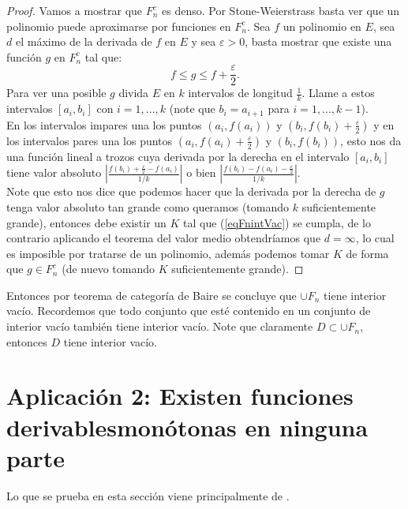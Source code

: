 \documentclass{article}
\theoremstyle{definition}
\begin{document}
\begin{proof}
Vamos a mostrar que $F_n^c$ es denso. Por Stone-Weierstrass basta ver que un polinomio puede aproximarse por funciones en $F_n^c$. Sea $f$ un polinomio en $E$, sea $d$ el máximo de la derivada de $f$ en $E$ y sea $\varepsilon>0$, basta mostrar que existe una función $g$ en $F_n^c$ tal que:
\begin{equation}\label{eqFnintVac}
f\leq g\leq f+\frac{\varepsilon}{2}.
\end{equation}
Para ver una posible $g$ divida $E$ en $k$ intervalos de longitud $\frac{1}{k}$. Llame a estos intervalos $[a_i,b_i]$ con $i=1,...,k$ (note que $b_i=a_{i+1}$ para $i=1,...,k-1$).\\
En los intervalos impares una los puntos $(a_i,f(a_i))$ y $(b_i,f(b_i)+\frac{\varepsilon}{2})$ y en los intervalos pares una los puntos $(a_i,f(a_i)+\frac{\varepsilon}{2})$ y $(b_i,f(b_i))$, esto nos da una función lineal a trozos cuya derivada por la derecha en el intervalo $[a_i,b_i]$ tiene valor absoluto $\left|\frac{f(b_i)+\frac{\varepsilon}{2}-f(a_i)}{1/k}\right|$    
o bien $\left|\frac{f(b_i)-f(a_i)-\frac{\varepsilon}{2}}{1/k}\right|$.    \\
Note que esto nos dice que podemos hacer que la derivada por la derecha de $g$ tenga valor absoluto tan grande como queramos (tomando $k$ suficientemente grande), entonces debe existir un $K$ tal que (\ref{eqFnintVac}) se cumpla, de lo contrario aplicando el teorema del valor medio obtendríamos que $d=\infty$, lo cual es imposible por tratarse de un polinomio, además podemos tomar $K$ de forma que $g\in F_n^c$ (de nuevo tomando $K$ suficientemente grande). 




\end{proof}


Entonces por teorema de categoría de Baire se concluye que $\cup F_n$ tiene interior vacío.
Recordemos que todo conjunto que esté contenido en un conjunto de interior vacío también tiene interior vacío. Note que claramente $D\subset \cup F_n$, entonces $D$ tiene interior vacío.



\section{Aplicación 2: Existen funciones derivables\newline monótonas en ninguna parte}\label{ap2}

Lo que se prueba en esta sección viene principalmente de \cite{weil76}.
\end{document}
